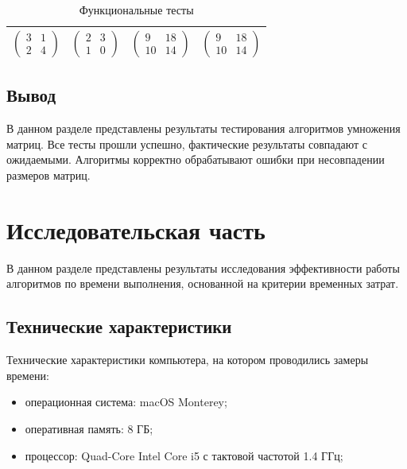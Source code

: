 \documentclass[a4paper, 12pt]{extreport}
\begin{document}
\begin{table}[h]
\begin{center}
\begin{threeparttable}
\begin{tabular}{|c|c|c|c|}
                $\begin{pmatrix}
                    3 & 1 \\
                    2 & 4
                \end{pmatrix}$ & 
                $\begin{pmatrix}
                    2 & 3 \\
                    1 & 0
                \end{pmatrix}$ & 
                $\begin{pmatrix}
                    9 & 18 \\
                    10 & 14
                \end{pmatrix}$ & 
                $\begin{pmatrix}
                    9 & 18 \\
                    10 & 14
                \end{pmatrix}$ \\ \hline
            \end{tabular}
        \end{threeparttable}
    \end{center}
    \caption{\label{tbl:functional_test} Функциональные тесты}
\end{table}


\section*{Вывод}
В данном разделе представлены результаты тестирования алгоритмов умножения матриц. Все тесты прошли успешно, фактические результаты совпадают с ожидаемыми. Алгоритмы корректно обрабатывают ошибки при несовпадении размеров матриц. 


\chapter{Исследовательская часть}
В данном разделе представлены результаты исследования эффективности работы алгоритмов по времени выполнения, основанной на критерии временных затрат.

\section{Технические характеристики}
Технические характеристики компьютера, на котором проводились замеры времени:

\begin{itemize} 
    \item[--] операционная система: macOS Monterey;
    \item[--] оперативная память: 8 ГБ;
    \item[--] процессор: Quad-Core Intel Core i5 с тактовой частотой 1.4 ГГц;
\end{itemize}
\end{document}
